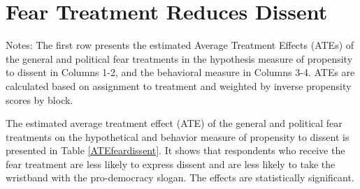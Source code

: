 \documentclass{article}
\begin{document}

\section{Fear Treatment Reduces Dissent}


\begin{table}[!htbp] \centering 
  \caption{Fear Treatment Reduces Dissent} 
  \label{ATEfeardissent} 
\begin{tablenotes}
      \small
\item Notes: The first row presents the estimated Average Treatment Effects (ATEs) of the general and political fear treatments in the hypothesis measure of propensity to dissent in Columns 1-2, and the behavioral measure in Columns 3-4. ATEs are calculated based on assignment to treatment and weighted by inverse propensity scores by block.
\end{tablenotes}
\end{table} 

The estimated average treatment effect (ATE) of the general and political fear treatments on the hypothetical and behavior measure of propensity to dissent is presented in Table \ref{ATEfeardissent}. It shows that respondents who receive the fear treatment are less likely to express dissent and are less likely to take the wristband with the pro-democracy slogan. The effects are statistically significant. 
\end{document}
